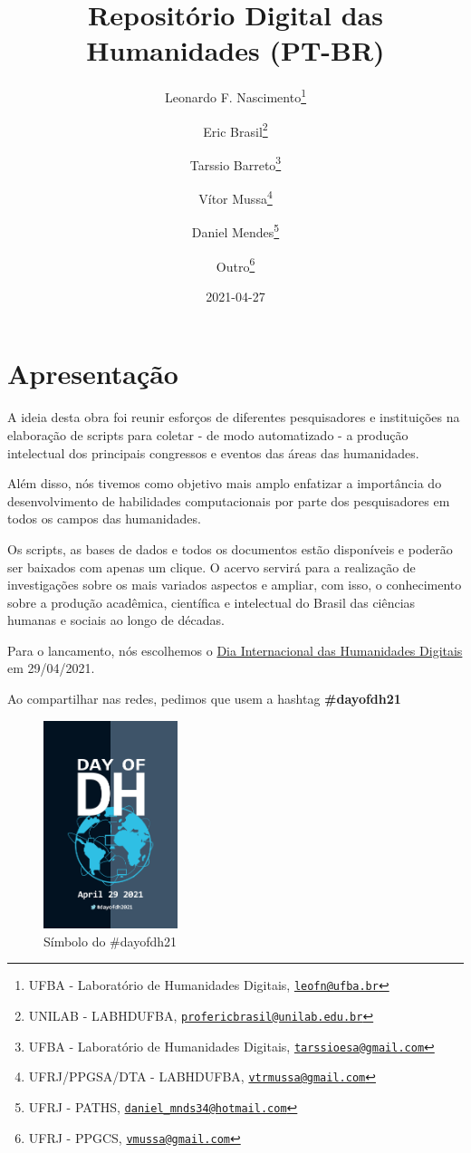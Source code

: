 \documentclass[
]{book}
\title{Repositório Digital das Humanidades (PT-BR)}
\author{Leonardo F. Nascimento\footnote{UFBA - Laboratório de Humanidades Digitais, \href{mailto:leofn@ufba.br}{\nolinkurl{leofn@ufba.br}}} \and Eric Brasil\footnote{UNILAB - LABHDUFBA, \href{mailto:profericbrasil@unilab.edu.br}{\nolinkurl{profericbrasil@unilab.edu.br}}} \and Tarssio Barreto\footnote{UFBA - Laboratório de Humanidades Digitais, \href{mailto:tarssioesa@gmail.com}{\nolinkurl{tarssioesa@gmail.com}}} \and Vítor Mussa\footnote{UFRJ/PPGSA/DTA - LABHDUFBA, \href{mailto:vtrmussa@gmail.com}{\nolinkurl{vtrmussa@gmail.com}}} \and Daniel Mendes\footnote{UFRJ - PATHS, \href{mailto:daniel_mnds34@hotmail.com}{\nolinkurl{daniel\_mnds34@hotmail.com}}} \and Outro\footnote{UFRJ - PPGCS, \href{mailto:vmussa@gmail.com}{\nolinkurl{vmussa@gmail.com}}}}
\date{2021-04-27}
\begin{document}
\maketitle

{
\setcounter{tocdepth}{1}
\tableofcontents
}
\hypertarget{apresentauxe7uxe3o}{%
\chapter{Apresentação}\label{apresentauxe7uxe3o}}

A ideia desta obra foi reunir esforços de diferentes pesquisadores e instituições na elaboração de scripts para coletar - de modo automatizado - a produção intelectual dos principais congressos e eventos das áreas das humanidades.

Além disso, nós tivemos como objetivo mais amplo enfatizar a importância do desenvolvimento de habilidades computacionais por parte dos pesquisadores em todos os campos das humanidades.

Os scripts, as bases de dados e todos os documentos estão disponíveis e poderão ser baixados com apenas um clique. O acervo servirá para a realização de investigações sobre os mais variados aspectos e ampliar, com isso, o conhecimento sobre a produção acadêmica, científica e intelectual do Brasil das ciências humanas e sociais ao longo de décadas.

Para o lancamento, nós escolhemos o \href{https://dhcenternet.org/initiatives/day-of-dh/2021}{Dia Internacional das Humanidades Digitais} em 29/04/2021.

Ao compartilhar nas redes, pedimos que usem a hashtag \textbf{\#dayofdh21}

\begin{figure}
\centering
\includegraphics[width=0.35\textwidth,height=\textheight]{./img/dayofdh.jpg}
\caption{Símbolo do \#dayofdh21}
\end{figure}
\end{document}
